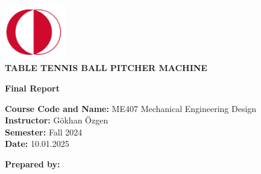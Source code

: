 \documentclass[12pt]{report}
\begin{document}
\vspace{1cm}

\begin{center}
    \includegraphics[width=0.2\textwidth]{metu_logo.png} \\ %
    \vspace{0.5cm}
    \textbf{\Large TABLE TENNIS BALL PITCHER MACHINE} \\
    \vspace{1cm}
\end{center}

\begin{center}
    \textbf{\Huge Final Report} \\
    \vspace{0.5cm}
    \vspace{1cm}
\end{center}

\noindent
\textbf{Course Code and Name:} ME407 Mechanical Engineering Design \\
\textbf{Instructor:} Gökhan Özgen \\
\textbf{Semester:} Fall 2024 \\
\textbf{Date:} 10.01.2025 \\
\vspace{1cm}

\noindent
\textbf{Prepared by:}
\vspace{0.5cm}
\end{document}
